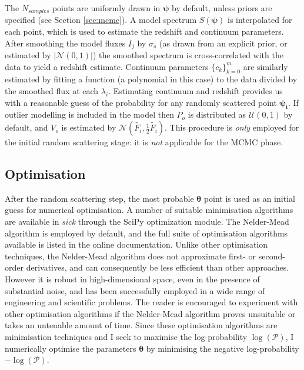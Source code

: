 \documentclass{aastex}
\newcommand{\sick}{\textit{sick}}
\begin{document}
The $N_{samples}$ points are uniformly drawn in $\bm{\psi}$ by default, unless priors are specified (see Section \ref{sec:mcmc}). A model spectrum $S(\bm{\psi})$ is interpolated for each point, which is used to estimate the redshift and continuum parameters. After smoothing the model fluxes $I_j$ by $\sigma_s$ (as drawn from an explicit prior, or estimated by $\left|\mathcal{N}\left(0, 1\right)\right|$) the smoothed spectrum is cross-correlated with the data to yield a redshift estimate. Continuum parameters $\{c_k\}_{k=0}^{m}$ are similarly estimated by fitting a function (a polynomial in this case) to the data divided by the smoothed flux at each $\lambda_i$. Estimating continuum and redshift provides us with a reasonable guess of the probability for any randomly scattered point $\bm{\psi_i}$. If outlier modelling is included in the model then $P_o$ is distributed as $\mathcal{U}\left(0, 1\right)$ by default, and $V_o$ is estimated by $\mathcal{N}\left(\widetilde{F_i}, \frac{1}{2}\widetilde{F_i}\right)$. This procedure is \textit{only} employed for the initial random scattering stage: it is \textit{not} applicable for the MCMC phase. 

\subsection{Optimisation}
\label{sec:optimise}

After the random scattering step, the most probable $\bm{\theta}$ point is used as an initial guess for numerical optimisation. A number of suitable minimisation algorithms are available in \sick{} through the SciPy \citep{scipy} optimization module. The Nelder-Mead algorithm \citep{nelder-mead} is employed by default, and the full suite of optimisation algorithms available is listed in the online documentation. Unlike other optimisation techniques, the Nelder-Mead algorithm does not approximate first- or second-order derivatives, and can consequently be less efficient than other approaches. However it is robust in high-dimensional space, even in the presence of substantial noise, and has been successfully employed in a wide range of engineering and scientific problems. The reader is encouraged to experiment with other optimisation algorithms if the Nelder-Mead algorithm proves unsuitable or takes an untenable amount of time. Since these optimisation algorithms are minimisation techniques and I seek to maximise the log-probability $\log{\left(\mathcal{P}\right)}$, I numerically optimise the parameters $\bm{\theta}$ by minimising the negative log-probability $-\log{\left(\mathcal{P}\right)}$.
\end{document}
